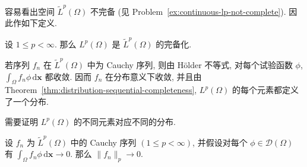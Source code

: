 容易看出空间 $\widetilde L^p(\Omega)$ 不完备 (见 Problem~\ref{ex:continuous-lp-not-complete}). 因此作如下定义.

\begin{Definition}
\label{def:lp-space-completion}
设 $1\leq p<\infty$. 那么 $L^p(\Omega)$ 是 $\widetilde L^p(\Omega)$ 的完备化.
\end{Definition}

\begin{Remark}
\label{rem:lp-completion-defines-distributions}
若序列 $f_n$ 在 $\widetilde L^p(\Omega)$ 中为 Cauchy 序列, 则由 Hölder 不等式, 对每个试验函数 $\phi$, $\int_\Omega f_n\phi\,\mathrm{d}\bm{x}$ 都收敛. 因而 $f_n$ 在分布意义下收敛, 并且由 Theorem~\ref{thm:distribution-sequential-completeness}, $L^p(\Omega)$ 的每个元素都定义了一个分布.
\end{Remark}

需要证明 $L^p(\Omega)$ 的不同元素对应不同的分布.

\begin{Lemma}
\label{lem:lp-completion-faithful-distribution-inclusion}
设 $f_n$ 为 $\widetilde L^p(\Omega)$ 中的 Cauchy 序列 $(1\leq p<\infty)$, 并假设对每个 $\phi\in\mathcal{D}(\Omega)$ 有 $\int_\Omega f_n\phi\,\mathrm{d}\bm{x}\to0$. 那么 $\|f_n\|_p\to0$.
\end{Lemma}

